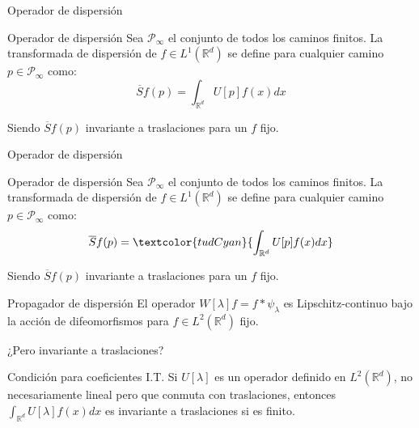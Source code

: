 \documentclass[aspectratio=43]{beamer}
\begin{document}
\begin{frame}{Operador de dispersión}
  \begin{alertblock}{Operador de dispersión}
    Sea $\mathcal{P}_\infty$ el conjunto de todos los caminos finitos. La transformada de dispersión de $f \in L^1(\mathbb{R}^d)$ se define para cualquier camino $p \in \mathcal{P}_\infty$ como:
    \begin{equation}
      \overline{S}f(p)=\int_{\mathbb{R}^d}U[p]f(x)dx 
    \end{equation}
  \end{alertblock}

  Siendo $\overline{S}f(p)$ invariante a traslaciones para un $f$ fijo.
\end{frame}


\begin{frame}{Operador de dispersión}
  \begin{alertblock}{Operador de dispersión}
    Sea $\mathcal{P}_\infty$ el conjunto de todos los caminos finitos. La transformada de dispersión de $f \in L^1(\mathbb{R}^d)$ se define para cualquier camino $p \in \mathcal{P}_\infty$ como:
    \begin{equation}
      \overline{S}f(p)=\textcolor{tudCyan}{\int_{\mathbb{R}^d}U[p]f(x)dx} 
    \end{equation}
  \end{alertblock}

  Siendo $\overline{S}f(p)$ invariante a traslaciones para un $f$ fijo.
\end{frame}


\begin{frame}{Propagador de dispersión}
  El operador $W[\lambda]f=f\ast \psi_\lambda$ es Lipschitz-continuo bajo la acción de difeomorfismos para $f \in L^2(\mathbb{R}^d)$ fijo. 

  \medskip

  \textcolor{tudCyan}{¿Pero invariante a traslaciones?}

  \medskip

  \begin{alertblock}{Condición para coeficientes I.T.}
    Si $U[\lambda]$ es un operador definido en $L^2(\mathbb{R}^d)$, no necesariamente lineal pero que conmuta con traslaciones, entonces $\int_{\mathbb{R}^d} U[\lambda]f(x)dx$ es invariante a traslaciones si es finito.
  \end{alertblock}

\end{frame}
\end{document}
